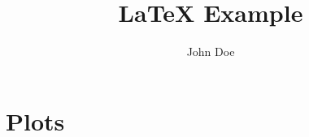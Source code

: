 \documentclass[border=10pt]{article}
\title{\LaTeX{} Example}
\author{John Doe}
\begin{document}
\maketitle

\section{Plots}
\begin{figure}[htbp]
    \centering
    
\end{figure}
\begin{figure}[htbp]
    \centering
    
\end{figure}
\begin{figure}[htbp]
    \centering
    
\end{figure}
\begin{figure}[htbp]
    \centering
    
\end{figure}

\begin{figure}[htbp]
    \centering
     \\
\end{figure}
\end{document}
